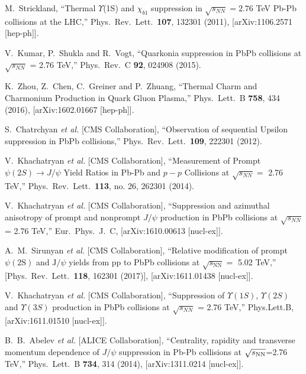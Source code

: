 \documentclass[aps,prc,preprint,superscriptaddress,showpacs,showkeys,amsmath]{revtex4-1}
\begin{document}
\noindent
\begin{thebibliography}{100}
\medskip


  M.~Strickland,
  ``Thermal $\Upsilon$(1S) and $\chi_{b1}$ suppression in $\sqrt{s_{NN}}=2.76$ TeV Pb-Pb collisions at the LHC,''
  Phys.\ Rev.\ Lett.\  {\bf 107}, 132301 (2011), [arXiv:1106.2571 [hep-ph]].

  V.~Kumar, P.~Shukla and R.~Vogt,
  ``Quarkonia suppression in PbPb collisions at $\sqrt{s_{NN}}$ = 2.76 TeV,''
  Phys.\ Rev.\ C {\bf 92}, 024908 (2015).

  K.~Zhou, Z.~Chen, C.~Greiner and P.~Zhuang,
  ``Thermal Charm and Charmonium Production in Quark Gluon Plasma,''
  Phys.\ Lett.\ B {\bf 758}, 434 (2016), [arXiv:1602.01667 [hep-ph]].


  S.~Chatrchyan {\it et al.} [CMS Collaboration],
  ``Observation of sequential Upsilon suppression in PbPb collisions,''
  Phys.\ Rev.\ Lett.\  {\bf 109}, 222301 (2012).


  V.~Khachatryan {\it et al.} [CMS Collaboration],
  ``Measurement of Prompt $\psi(2S) \to J/\psi$ Yield Ratios in Pb-Pb and $p-p$ Collisions at $\sqrt {s_{NN}}=$ 2.76  TeV,''
  Phys.\ Rev.\ Lett.\  {\bf 113}, no. 26, 262301 (2014).


  V.~Khachatryan {\it et al.} [CMS Collaboration],
  ``Suppression and azimuthal anisotropy of prompt and nonprompt $J/\psi$ production in PbPb collisions at $\sqrt{s_{NN}}$ = 2.76 TeV,''
  Eur.\ Phys.\ J.\ C, [arXiv:1610.00613 [nucl-ex]].



  A.~M.~Sirunyan {\it et al.} [CMS Collaboration],
  ``Relative modification of prompt $ {\psi\mathrm{(2S)}} $ and $\mathrm{J}/\psi $ yields from pp to PbPb collisions at ${\sqrt{s_{\mathrm{NN}}}} = $ 5.02 TeV,''
  [Phys.\ Rev.\ Lett.\  {\bf 118}, 162301 (2017)], [arXiv:1611.01438 [nucl-ex]].


  V.~Khachatryan {\it et al.} [CMS Collaboration],
  ``Suppression of $\Upsilon(1S)$, $\Upsilon(2S)$ and $\Upsilon(3S)$ production in PbPb collisions at $\sqrt{s_{NN}}$ = 2.76 TeV,''
  Phys.Lett.B, [arXiv:1611.01510 [nucl-ex]].

  B.~B.~Abelev {\it et al.} [ALICE Collaboration],
  ``Centrality, rapidity and transverse momentum dependence of $J/\psi$ suppression in Pb-Pb collisions at $\sqrt{s_{\rm NN}}$=2.76 TeV,''
  Phys.\ Lett.\ B {\bf 734}, 314 (2014), [arXiv:1311.0214 [nucl-ex]].



\end{thebibliography}
\end{document}
